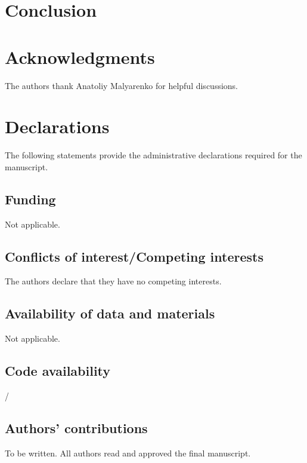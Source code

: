 \documentclass[10pt]{article}
\theoremstyle{plain}
\theoremstyle{definition}
\theoremstyle{remark}
\begin{document}


\section{Conclusion}\label{sec:conclusion}



\section*{Acknowledgments}
The authors thank Anatoliy Malyarenko for helpful discussions.

\section*{Declarations}

The following statements provide the administrative declarations required for the manuscript.

\subsection*{Funding}
Not applicable.

\subsection*{Conflicts of interest/Competing interests}
The authors declare that they have no competing interests.

\subsection*{Availability of data and materials}
Not applicable.

\subsection*{Code availability}
/

\subsection*{Authors' contributions}
To be written.  All authors read and approved the final manuscript.


\end{document}
